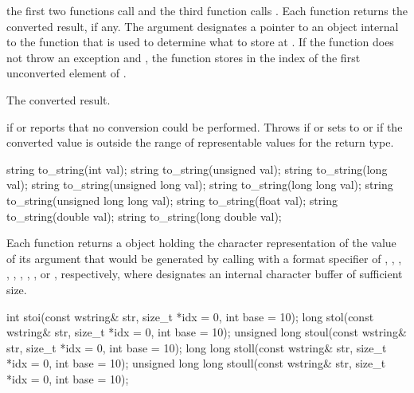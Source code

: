 \begin{itemdescr}
\pnum
\effects the first two functions call  and the
third function calls . Each function returns
the converted result, if any. The argument  designates a pointer to
an object internal to the function that is used to determine what to store at
. If the function does not throw an exception and ,
the function stores in  the index of the first unconverted element
of .

\pnum
\returns The converted result.

\pnum
\throws {} if  or  reports
that no conversion could be performed. Throws  if
 or  sets  to 
or if the converted value is outside the range of representable
values for the return type.
\end{itemdescr}

%
\begin{itemdecl}
string to_string(int val);
string to_string(unsigned val);
string to_string(long val);
string to_string(unsigned long val);
string to_string(long long val);
string to_string(unsigned long long val);
string to_string(float val);
string to_string(double val);
string to_string(long double val);
\end{itemdecl}

\begin{itemdescr}
\pnum
\returns Each function returns a  object holding the character
representation of the value of its argument that would be generated by calling
 with a format specifier of
,
,
,
,
,  ,
,
,
or , respectively, where  designates an internal
character buffer of sufficient size.
\end{itemdescr}

%
%
%
%
%
\begin{itemdecl}
int stoi(const wstring& str, size_t *idx = 0, int base = 10);
long stol(const wstring& str, size_t *idx = 0, int base = 10);
unsigned long stoul(const wstring& str, size_t *idx = 0, int base = 10);
long long stoll(const wstring& str, size_t *idx = 0, int base = 10);
unsigned long long stoull(const wstring& str, size_t *idx = 0, int base = 10);
\end{itemdecl}


